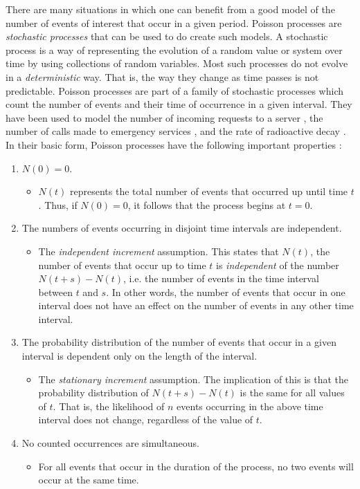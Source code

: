 \documentclass[a4paper,11pt]{article}
\begin{document}
   There are many situations in which one can benefit from a good model of the
   number of events of interest that occur in a given period. Poisson processes
   are \emph{stochastic processes} that can be used to do create such models. A
   stochastic process is a way of representing the evolution of a random value
   or system over time by using collections of random variables. Most such
   processes do not evolve in a \emph{deterministic} way. That is, the way they
   change as time passes is not predictable. Poisson processes are part of a
   family of stochastic processes which count the number of events and their
   time of occurrence in a given interval. They have been used to model the
   number of incoming requests to a server \cite{arlitt1997internet}, the number
   of calls made to emergency services \cite{hajjam2008approach}, and the rate
   of radioactive decay \cite{cannizzaro1978results}. In their basic form,
   Poisson processes have the following important properties
   \cite{ross1997simulation}:
\begin{enumerate}
\item $N(0)=0$.
\begin{itemize}
\item $N(t)$ represents the total number of events that occurred up until time
     $t$. Thus, if $N(0)=0$, it follows that the process begins at $t=0$.
\end{itemize}
\item The numbers of events occurring in disjoint time intervals are independent.
\begin{itemize}
\item The \emph{independent increment} assumption. This states that $N(t)$, the
     number of events that occur up to time $t$ is \emph{independent} of the
     number $N(t+s)-N(t)$, i.e. the number of events in the time interval
     between $t$ and $s$. In other words, the number of events that occur in one
     interval does not have an effect on the number of events in any other time
     interval.
\end{itemize}
\item The probability distribution of the number of events that occur in a given
   interval is dependent only on the length of the interval.
\begin{itemize}
\item The \emph{stationary increment} assumption. The implication of this is that
     the probability distribution of $N(t+s)-N(t)$ is the same for all values of
     $t$. That is, the likelihood of $n$ events occurring in the above time
     interval does not change, regardless of the value of $t$.
\end{itemize}
\item No counted occurrences are simultaneous.
\begin{itemize}
\item For all events that occur in the duration of the process, no two events
     will occur at the same time.
\end{itemize}
\end{enumerate}
\end{document}
